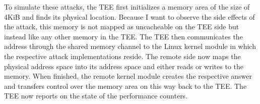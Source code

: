 To simulate these attacks, the TEE first initializes a memory area of the size
of 4KiB and finds its physical location. Because I want to observe the side
effects of the attack, this memory is not mapped as uncacheable on the TEE side
but instead like any other memory in the TEE. The TEE then communicates the
address through the shared memory channel to the Linux kernel module in which
the respective attack implementations reside. The remote side now maps the
physical address space into its address space and either reads or writes to the
memory. When finished, the remote kernel module creates the respective answer
and transfers control over the memory area on this way back to the TEE. The TEE
now reports on the state of the performance counters.\\

\cleardoublepage

